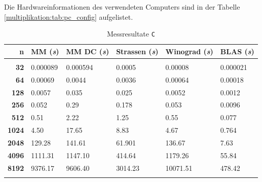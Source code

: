 Die Hardwareinformationen des verwendeten Computers sind in der Tabelle \ref{multiplikation:tab:pc_config} aufgelistet.


\begin{table}
			 \begin{center}
					 \begin{tabular}{r l l l l l}
							 \hline
							 \hline
							 \textbf{n} & \textbf{MM (\textit{s})} &  \textbf{MM DC (\textit{s})} & \textbf{Strassen (\textit{s})}  & \textbf{Winograd (\textit{s})} & \textbf{BLAS (\textit{s})} \\
							 \hline
							 \multicolumn{6}{c}{} \\
							 \textbf{32}   & \phantom{000}0.000089 & \phantom{000}0.000594 & \phantom{000}0.0005  & \phantom{0000}0.00008 & \phantom{00}0.000021  \\
							 \textbf{64}   & \phantom{000}0.00069  & \phantom{000}0.0044   & \phantom{000}0.0036  & \phantom{0000}0.00064 & \phantom{00}0.00018   \\
							 \textbf{128}  & \phantom{000}0.0057   & \phantom{000}0.035    & \phantom{000}0.025   & \phantom{0000}0.0052  & \phantom{00}0.0012    \\
							 \textbf{256}  & \phantom{000}0.052    & \phantom{000}0.29     & \phantom{000}0.178   & \phantom{0000}0.053   & \phantom{00}0.0096     \\
							 \textbf{512}  & \phantom{000}0.51     & \phantom{000}2.22     & \phantom{000}1.25    & \phantom{0000}0.55    & \phantom{00}0.077     \\
							 \textbf{1024} & \phantom{000}4.50     & \phantom{00}17.65     & \phantom{000}8.83    & \phantom{0000}4.67    & \phantom{00}0.764     \\
							 \textbf{2048} & \phantom{0}129.28     & \phantom{0}141.61     & \phantom{00}61.901   & \phantom{00}136.67    & \phantom{00}7.63      \\
							 \textbf{4096} & 1111.31               & 1147.10               & \phantom{0}414.64    & \phantom{0}1179.26    & \phantom{0}55.84     \\
							 \textbf{8192} & 9376.17               & 9606.40               & 3014.23              & 10071.51              & 478.42     \\
							 \multicolumn{6}{c}{} \\
							 \hline
							 \hline
					 \end{tabular}
			 \end{center}
			 \caption{Messresultate \texttt{C}}
			 \label{multiplikation:tab:messung_C}
	 \end{table}



